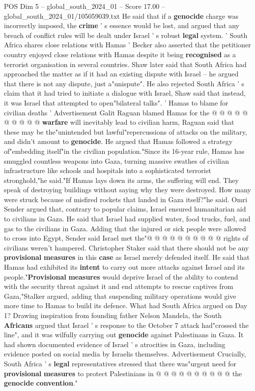\begin{textsample}{POS Dim 5 – global\_south\_2024\_01 – Score 17.00 – global\_south\_2024\_01/105059039.txt}
He said that if a \textbf{genocide} charge was incorrectly imposed, the \textbf{crime} ' s essence would be lost, and argued that any breach of conflict rules will be dealt under Israel ' s robust \textbf{legal} system. ' South Africa shares close relations with Hamas ' Becker also asserted that the petitioner country enjoyed close relations with Hamas despite it being \textbf{recognised} as a terrorist organisation in several countries.
Shaw later said that South Africa had approached the matter as if it had an existing dispute with Israel -- he argued that there is not any dispute, just a"unispute".
He also rejected South Africa ' s claim that it had tried to initiate a dialogue with Israel, Shaw said that instead, it was Israel that attempted to open"bilateral talks". ' Hamas to blame for civilian deaths ' Advertisement Galit Raguan blamed Hamas for the @ @ @ @ @ @ @ @ @ @ \textbf{warfare} will inevitably lead to civilian harm, Raguan said that these may be the"unintended but lawful"repercussions of attacks on the military, and didn't amount to \textbf{genocide}.
He argued that Hamas followed a strategy of"embedding itself"in the civilian population."Since its 16-year rule, Hamas has smuggled countless weapons into Gaza, turning massive swathes of civilian infrastructure like schools and hospitals into a sophisticated terrorist stronghold,"he said."If Hamas lays down its arms, the suffering will end.
They speak of destroying buildings without saying why they were destroyed.
How many were struck because of misfired rockets that landed in Gaza itself?"he said.
Omri Sender argued that, contrary to popular claims, Israel ensured humanitarian aid to civilians in Gaza.
He said that Israel had supplied water, food trucks, fuel, and gas to the civilians in Gaza.
Adding that the injured or sick people were allowed to cross into Egypt, Sender said Israel met the"@ @ @ @ @ @ @ @ @ @ rights of civilians weren't hampered.
Christopher Staker said that there should not be any \textbf{provisional} \textbf{measures} in this \textbf{case} as Israel merely defended itself.
He said that Hamas had exhibited its \textbf{intent} to carry out more attacks against Israel and its people."\textbf{Provisional} \textbf{measures} would deprive Israel of the ability to contend with the security threat against it and end attempts to rescue captives from Gaza,"Stalker argued, adding that suspending military operations would give more time to Hamas to build its defence.
What had South Africa argued on Day 1?
Drawing inspiration from founding father Nelson Mandela, the South \textbf{Africans} argued that Israel ' s response to the October 7 attack had"crossed the line", and it was wilfully carrying out \textbf{genocide} against Palestinans in Gaza.
It had shown documented evidence of Israel ' s atrocities in Gaza, including evidence posted on social media by Israelis themselves.
Advertisement Crucially, South Africa ' s \textbf{legal} representatives stressed that there was"urgent need for \textbf{provisional} \textbf{measures} to protect Palestinians in @ @ @ @ @ @ @ @ @ @ the \textbf{genocide} \textbf{convention}."


\end{textsample}
